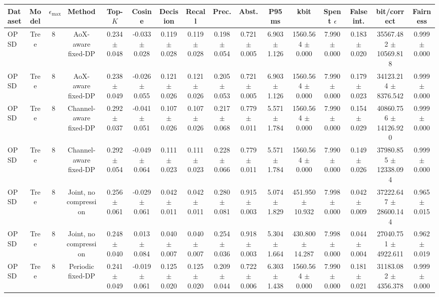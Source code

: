 \begin{tabular}{lccccccccccccccc}
\toprule
Dataset & Model & $\epsilon_{\max}$ & Method & Top-$K$ & Cosine & Decision & Recall & Prec. & Abst. & P95 ms & kbit & Spent $\epsilon$ & False int. & bit/correct & Fairness \\
\midrule
OPSD & Tree & 8 & AoX-aware fixed-DP & 0.234 $\pm$ 0.048 & -0.033 $\pm$ 0.028 & 0.119 $\pm$ 0.028 & 0.119 $\pm$ 0.028 & 0.198 $\pm$ 0.054 & 0.721 $\pm$ 0.005 & 6.903 $\pm$ 1.126 & 1560.564 $\pm$ 0.000 & 7.990 $\pm$ 0.000 & 0.183 $\pm$ 0.020 & 35567.482 $\pm$ 10569.818 & 0.999 $\pm$ 0.000 \\
OPSD & Tree & 8 & AoX-aware fixed-DP & 0.238 $\pm$ 0.049 & -0.026 $\pm$ 0.055 & 0.121 $\pm$ 0.026 & 0.121 $\pm$ 0.026 & 0.205 $\pm$ 0.053 & 0.721 $\pm$ 0.005 & 6.903 $\pm$ 1.126 & 1560.564 $\pm$ 0.000 & 7.990 $\pm$ 0.000 & 0.179 $\pm$ 0.023 & 34123.214 $\pm$ 8376.542 & 0.999 $\pm$ 0.000 \\
OPSD & Tree & 8 & Channel-aware fixed-DP & 0.292 $\pm$ 0.037 & -0.041 $\pm$ 0.051 & 0.107 $\pm$ 0.026 & 0.107 $\pm$ 0.026 & 0.217 $\pm$ 0.068 & 0.779 $\pm$ 0.011 & 5.571 $\pm$ 1.784 & 1560.564 $\pm$ 0.000 & 7.990 $\pm$ 0.000 & 0.154 $\pm$ 0.029 & 40860.756 $\pm$ 14126.920 & 0.999 $\pm$ 0.000 \\
OPSD & Tree & 8 & Channel-aware fixed-DP & 0.292 $\pm$ 0.054 & -0.049 $\pm$ 0.064 & 0.111 $\pm$ 0.023 & 0.111 $\pm$ 0.023 & 0.228 $\pm$ 0.066 & 0.779 $\pm$ 0.011 & 5.571 $\pm$ 1.784 & 1560.564 $\pm$ 0.000 & 7.990 $\pm$ 0.000 & 0.149 $\pm$ 0.026 & 37980.855 $\pm$ 12338.094 & 0.999 $\pm$ 0.000 \\
OPSD & Tree & 8 & Joint, no compression & 0.256 $\pm$ 0.061 & -0.029 $\pm$ 0.061 & 0.042 $\pm$ 0.011 & 0.042 $\pm$ 0.011 & 0.280 $\pm$ 0.081 & 0.915 $\pm$ 0.003 & 5.074 $\pm$ 1.829 & 451.950 $\pm$ 10.932 & 7.998 $\pm$ 0.000 & 0.042 $\pm$ 0.009 & 37222.647 $\pm$ 28600.144 & 0.965 $\pm$ 0.015 \\
OPSD & Tree & 8 & Joint, no compression & 0.248 $\pm$ 0.040 & 0.013 $\pm$ 0.084 & 0.040 $\pm$ 0.007 & 0.040 $\pm$ 0.007 & 0.254 $\pm$ 0.036 & 0.918 $\pm$ 0.003 & 5.304 $\pm$ 1.664 & 430.800 $\pm$ 14.287 & 7.998 $\pm$ 0.000 & 0.044 $\pm$ 0.004 & 27040.751 $\pm$ 4922.611 & 0.962 $\pm$ 0.019 \\
OPSD & Tree & 8 & Periodic fixed-DP & 0.241 $\pm$ 0.049 & -0.019 $\pm$ 0.061 & 0.125 $\pm$ 0.020 & 0.125 $\pm$ 0.020 & 0.209 $\pm$ 0.044 & 0.722 $\pm$ 0.006 & 6.303 $\pm$ 1.438 & 1560.564 $\pm$ 0.000 & 7.990 $\pm$ 0.000 & 0.181 $\pm$ 0.021 & 31183.082 $\pm$ 4356.378 & 0.999 $\pm$ 0.000 \\

\end{tabular}
